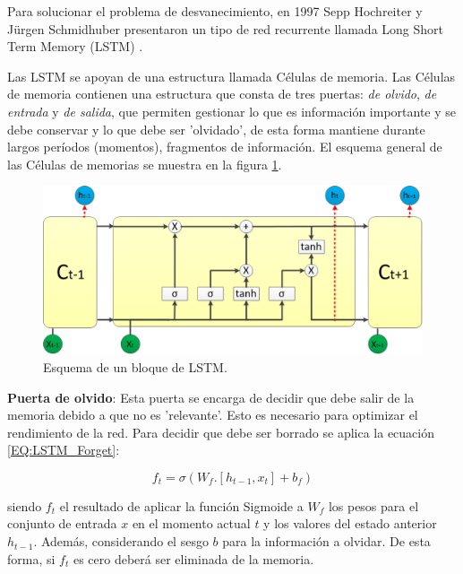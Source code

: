             Para solucionar el problema de desvanecimiento, en 1997 Sepp Hochreiter y Jürgen Schmidhuber presentaron un tipo de red recurrente llamada Long Short Term Memory (LSTM) \cite{Hochreiter1997}.
       
            Las LSTM se apoyan de una estructura llamada Células de memoria. Las Células de memoria contienen una estructura que consta de tres puertas: \textit{de olvido}, \textit{de entrada} y \textit{de salida}, que permiten gestionar lo que es información importante y se debe conservar y lo que debe ser 'olvidado', de esta forma mantiene durante largos períodos (momentos), fragmentos de información. El esquema general de las Células de memorias se muestra en la figura \ref{fig:RNN-lstm}.
            
            \begin{figure}[ht!]
            	\centering
            	\includegraphics[width=0.9\linewidth]{imgs/02-Referential/02-arch-rnn-lstm.png}
            	\caption[Esquema de un bloque de LSTM]{Esquema de un bloque de LSTM.}
        	    \label{fig:RNN-lstm}
            \end{figure}%
            
            \textbf{Puerta de olvido}: Esta puerta se encarga de decidir que debe salir de la memoria debido a que no es 'relevante'. Esto es necesario para optimizar el rendimiento de la red. Para decidir que debe ser borrado se aplica la ecuación \ref{EQ:LSTM_Forget}:
        
            \begin{equation}
                \label{EQ:LSTM_Forget}
                f_t = \sigma(W_f . [h_{t-1}, x_t] + b_f)
            \end{equation}
            
            siendo $f_t$ el resultado de aplicar la función Sigmoide a $W_f$ los pesos para el conjunto de entrada $x$ en el momento actual $t$ y los valores del estado anterior $h_{t-1}$. Además, considerando el sesgo $b$ para la información a olvidar. De esta forma, si $f_t$ es cero deberá ser eliminada de la memoria.
            
